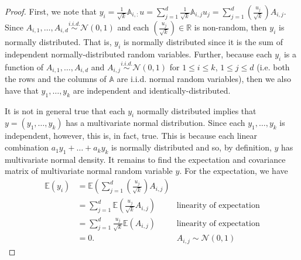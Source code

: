 \documentclass{article}
\begin{document}
    \begin{proof}
    First, we note that $y_i = \frac{1}{\sqrt{k}} \mathbb{A}_{i,:}u = \sum_{j=1}^d \frac{1}{\sqrt{k}} \mathbb{A}_{i,j} u_j = \sum_{j=1}^d \left(\frac{u_j}{\sqrt{k}} \right) A_{i,j}$. Since $A_{i,1}, \ldots, A_{i,d} \overset{i.i.d.}{\sim} \mathcal{N}(0, 1)$ and each $\left(\frac{u_j}{\sqrt{k}} \right) \in \mathbb{R}$ is non-random, then $y_i$ is normally distributed. That is, $y_i$ is normally distributed since it is the sum of independent normally-distributed random variables. Further, because each $y_i$ is a function of $A_{i,1}, \ldots, A_{i,d}$ and $A_{i, j} \overset{i.i.d.}{\sim} \mathcal{N}(0, 1)$ for $1 \le i \le k$, $1 \le j \le d$ (i.e. both the rows and the columns of $\mathbb{A}$ are i.i.d. normal random variables), then we also have that $y_1, \ldots, y_k$ are independent and identically-distributed. 
    
    \noindent
    It is not in general true that each $y_i$ normally distributed implies that $y = (y_1, \ldots, y_k)$ has a multivariate normal distribution. Since each $y_1, \ldots, y_k$ is independent, however, this is, in fact, true. This is because each linear combination $a_1y_1 + \ldots + a_ky_k$ is normally distributed and so, by definition, $y$ has multivariate normal density. It remains to find the expectation and covariance matrix of multivariate normal random variable $y$. For the expectation, we have
    \begin{align*}
        \mathbb{E}(y_i) &= \mathbb{E} \left( \sum_{j=1}^d \left(\frac{u_j}{\sqrt{k}} \right) A_{i,j} \right)\\
                        &= \sum_{j=1}^d \mathbb{E}\left( \frac{u_j}{\sqrt{k}}A_{i,j}  \right) &\text{linearity of expectation}\\
                        &= \sum_{j=1}^d \frac{u_j}{\sqrt{k}} \mathbb{E}\left(A_{i,j} \right) &\text{linearity of expectation}\\
                        &= 0. &A_{i,j} \sim \mathcal{N}(0, 1)
    \end{align*}
    

\end{proof}
\end{document}
